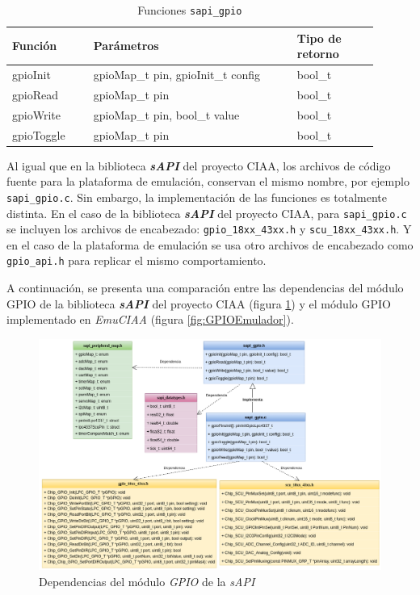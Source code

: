 \begin{table}[h]
	\centering
	\caption[Funciones \texttt{sapi\_gpio}]{Funciones \texttt{sapi\_gpio}}
	\begin{tabular}{p{0.20\linewidth} p{0.50\linewidth}  p{0.20\linewidth}}    
		\toprule
		\textbf{Función} 	 & \textbf{Parámetros} 		& \textbf{Tipo de retorno}  \\
		\midrule
		gpioInit & gpioMap\_t pin, gpioInit\_t config 		&  bool\_t \\		
		gpioRead	 & gpioMap\_t pin			&  bool\_t \\
		gpioWrite	 & gpioMap\_t pin, bool\_t value			& bool\_t \\
		gpioToggle	 & gpioMap\_t pin				&  bool\_t \\
		\bottomrule
		\hline
	\end{tabular}
	\label{tab:sapiGPIO}
\end{table}

Al igual que en la biblioteca \textit{\textbf{sAPI}} del proyecto CIAA, los archivos de código fuente para la plataforma de emulación, conservan el mismo nombre, por ejemplo  \texttt{sapi\_gpio.c}. Sin embargo, la implementación de las funciones es totalmente distinta. En el caso de la biblioteca \textit{\textbf{sAPI}} del proyecto CIAA, para \texttt{sapi\_gpio.c}  se incluyen los archivos de encabezado: \texttt{gpio\_18xx\_43xx.h} y \newline \texttt{scu\_18xx\_43xx.h}. Y en el caso de la plataforma de emulación se usa otro archivos de encabezado como \texttt{gpio\_api.h} para replicar el mismo comportamiento.

A continuación, se presenta una comparación entre las dependencias del módulo GPIO de la biblioteca \textit{\textbf{sAPI}} del proyecto CIAA (figura \ref{fig:GPIOsAPI}) y el módulo GPIO implementado en \textit{EmuCIAA} (figura \ref{fig:GPIOEmulador}). 

\begin{figure}[ht]
	\centering
	\includegraphics[scale=.50]{./Figures/DiagramaClasesGPIOsAPI.png}
	\caption{Dependencias del módulo \textit{GPIO} de la \textit{sAPI}}
	\label{fig:GPIOsAPI}
\end{figure}

